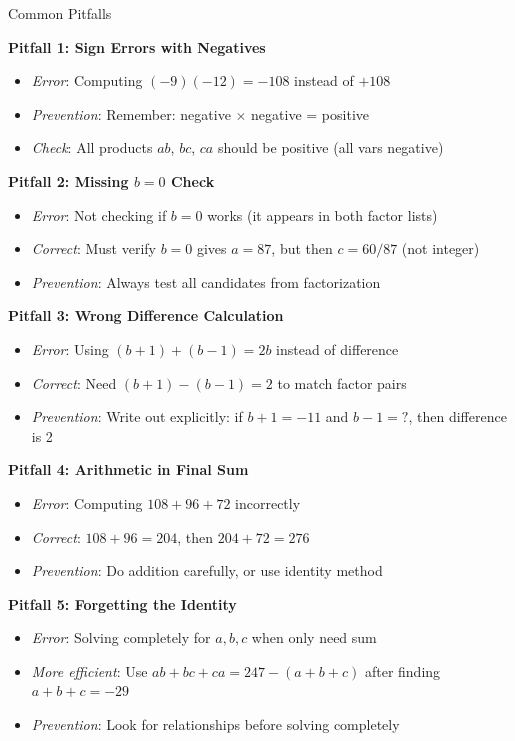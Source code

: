 \documentclass[12pt]{article}
\begin{document}
\begin{warningbox}{Common Pitfalls}

\textbf{Pitfall 1: Sign Errors with Negatives}
\begin{itemize}
    \item \textit{Error}: Computing $(-9)(-12) = -108$ instead of $+108$
    \item \textit{Prevention}: Remember: negative $\times$ negative = positive
    \item \textit{Check}: All products $ab$, $bc$, $ca$ should be positive (all vars negative)
\end{itemize}

\textbf{Pitfall 2: Missing $b=0$ Check}
\begin{itemize}
    \item \textit{Error}: Not checking if $b = 0$ works (it appears in both factor lists)
    \item \textit{Correct}: Must verify $b=0$ gives $a = 87$, but then $c = 60/87$ (not integer)
    \item \textit{Prevention}: Always test all candidates from factorization
\end{itemize}

\textbf{Pitfall 3: Wrong Difference Calculation}
\begin{itemize}
    \item \textit{Error}: Using $(b+1) + (b-1) = 2b$ instead of difference
    \item \textit{Correct}: Need $(b+1) - (b-1) = 2$ to match factor pairs
    \item \textit{Prevention}: Write out explicitly: if $b+1 = -11$ and $b-1 = ?$, then difference is 2
\end{itemize}

\textbf{Pitfall 4: Arithmetic in Final Sum}
\begin{itemize}
    \item \textit{Error}: Computing $108 + 96 + 72$ incorrectly
    \item \textit{Correct}: $108 + 96 = 204$, then $204 + 72 = 276$
    \item \textit{Prevention}: Do addition carefully, or use identity method
\end{itemize}

\textbf{Pitfall 5: Forgetting the Identity}
\begin{itemize}
    \item \textit{Error}: Solving completely for $a, b, c$ when only need sum
    \item \textit{More efficient}: Use $ab+bc+ca = 247 - (a+b+c)$ after finding $a+b+c = -29$
    \item \textit{Prevention}: Look for relationships before solving completely
\end{itemize}


\end{warningbox}
\end{document}
